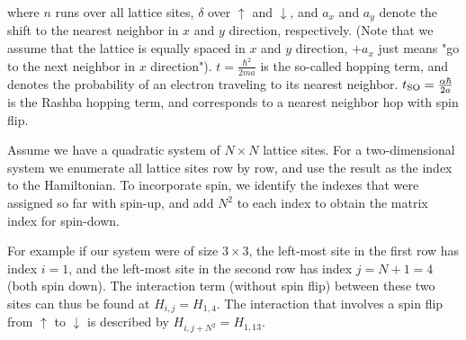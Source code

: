 \documentclass[11pt,twoside]{book}
\newcommand{\tso}{\ensuremath{t_{\textnormal{SO}}}}
\begin{document}
where $n$ runs over all lattice sites, $\delta$ over $\uparrow$ and
$\downarrow$, and $a_x$ and $a_y$ denote the shift to the nearest neighbor in
$x$ and $y$ direction, respectively. (Note that we assume that the lattice is
equally spaced in $x$ and $y$ direction, $+a_x$ just means "go to the next
neighbor in $x$ direction"). $t = \frac{\hbar^2}{2ma}$ is the so-called hopping term, and denotes the
probability of an electron traveling to its nearest neighbor.
$\tso = \frac{\alpha \hbar}{2a}$ is the
Rashba hopping term, and corresponds to a nearest neighbor hop with spin
flip.

Assume we have a quadratic system of $N \times N$ lattice sites.
For a two-dimensional system we enumerate all lattice sites row by row, and
use the result as the index to the Hamiltonian. To incorporate spin, we
identify the indexes that were assigned so far with spin-up, and add $N^2$ to
each index to obtain the matrix index for spin-down.

For example if our system were of size $3 \times 3$, the left-most site in the
first row has index $i = 1$, and the left-most site in the second row has
index $j = N + 1 = 4$ (both spin down). The interaction term (without spin
flip) between these two sites can thus be found at $H_{i,j} = H_{1,4}$. The
interaction that involves a spin flip from $\uparrow$ to $\downarrow$ is
described by $H_{i, j+N^2} = H_{1, 13}$.
\end{document}
